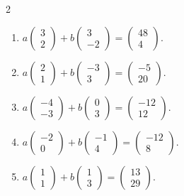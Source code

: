 \begin{multicols}{2}
\begin{enumerate}[label=\arabic*.,  leftmargin=*]
\item $a\begin{pmatrix} 3 \\ 2 \end{pmatrix} + b\begin{pmatrix} 3 \\ -2 \end{pmatrix} = \begin{pmatrix} 48 \\ 4 \end{pmatrix}$.
\item $a\begin{pmatrix} 2 \\ 1 \end{pmatrix} + b\begin{pmatrix} -3 \\ 3 \end{pmatrix} = \begin{pmatrix} -5 \\ 20 \end{pmatrix}$.
\item $a\begin{pmatrix} -4 \\ -3 \end{pmatrix} + b\begin{pmatrix} 0 \\ 3 \end{pmatrix} = \begin{pmatrix} -12 \\ 12 \end{pmatrix}$.
\item $a\begin{pmatrix} -2 \\ 0 \end{pmatrix} + b\begin{pmatrix} -1 \\ 4 \end{pmatrix} = \begin{pmatrix} -12 \\ 8 \end{pmatrix}$.
\item $a\begin{pmatrix} 1 \\ 1 \end{pmatrix} + b\begin{pmatrix} 1 \\ 3 \end{pmatrix} = \begin{pmatrix} 13 \\ 29 \end{pmatrix}$.

\end{enumerate}
\end{multicols}
